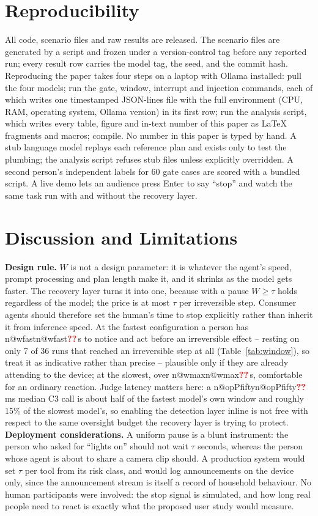 \documentclass[conference]{IEEEtran}
\makeatletter
\newcommand{\pend}{\textcolor{red}{\textbf{??}}}
\newcommand{\num}[1]{\ifcsname n@#1\endcsname\csname n@#1\endcsname\else\pend\fi}
\makeatother
\begin{document}
\section{Reproducibility}
All code, scenario files and raw results are released. The scenario files are generated by a script and frozen under a version-control tag before any reported run; every result row carries the model tag, the seed, and the commit hash. Reproducing the paper takes four steps on a laptop with Ollama installed: pull the four models; run the gate, window, interrupt and injection commands, each of which writes one timestamped JSON-lines file with the full environment (CPU, RAM, operating system, Ollama version) in its first row; run the analysis script, which writes every table, figure and in-text number of this paper as \LaTeX{} fragments and macros; compile. No number in this paper is typed by hand. A stub language model replays each reference plan and exists only to test the plumbing; the analysis script refuses stub files unless explicitly overridden. A second person's independent labels for 60 gate cases are scored with a bundled script. A live demo lets an audience press Enter to say ``stop'' and watch the same task run with and without the recovery layer.

\section{Discussion and Limitations}
\textbf{Design rule.} $W$ is not a design parameter: it is whatever the agent's speed, prompt processing and plan length make it, and it shrinks as the model gets faster. The recovery layer turns it into one, because with a pause $W\ge\tau$ holds regardless of the model; the price is at most $\tau$ per irreversible step. Consumer agents should therefore set the human's time to stop explicitly rather than inherit it from inference speed.
At the fastest configuration a person has \num{wfast}\,s to notice and act before an irreversible effect -- resting on only 7 of 36 runs that reached an irreversible step at all (Table~\ref{tab:window}), so treat it as indicative rather than precise -- plausible only if they are already attending to the device; at the slowest, over \num{wmax}\,s, comfortable for an ordinary reaction. Judge latency matters here: a \num{opPfifty}\,ms median C3 call is about half of the fastest model's own window and roughly 15\% of the slowest model's, so enabling the detection layer inline is not free with respect to the same oversight budget the recovery layer is trying to protect.
\textbf{Deployment considerations.} A uniform pause is a blunt instrument: the person who asked for ``lights on'' should not wait $\tau$ seconds, whereas the person whose agent is about to share a camera clip should. A production system would set $\tau$ per tool from its risk class, and would log announcements on the device only, since the announcement stream is itself a record of household behaviour. No human participants were involved: the stop signal is simulated, and how long real people need to react is exactly what the proposed user study would measure.
\end{document}
